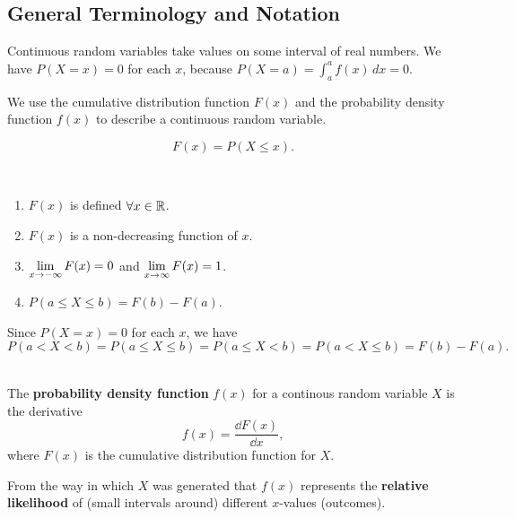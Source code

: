 \subsection{General Terminology and Notation}

Continuous random variables take values on some interval of real numbers. We have $P(X = x) = 0$ for each $x$, because $P(X = a) = \displaystyle \int_{a}^{a} f(x) \, dx = 0$. 

We use the cumulative distribution function $F(x)$ and the probability density function $f(x)$ to describe a continuous random variable.

\begin{definition}
    \phantom{}
    \[F(x) = P(X \leq x).\]
\end{definition}

\begin{theorem}
    \phantom{}\
    \begin{enumerate}
        \item $F(x)$ is defined $\forall x \in {\mathbb{R}}$.
        \item $F(x)$ is a non-decreasing function of $x$.
        \item $\displaystyle \lim_{x \to -\infty} F(x) = 0$ and $\displaystyle \lim_{x \to \infty} F(x) = 1$.
        \item  $P(a \leq X \leq b) = F(b) - F(a)$.
    \end{enumerate}
\end{theorem}

\begin{note}
    Since $P(X = x) = 0$ for each $x$, we have \vspace{-3mm}
    \[P(a < X < b) = P(a \leq X \leq b) = P(a \leq X < b) = P(a < X \leq b) = F(b) - F(a).\]
\end{note}

\begin{definition}
    \phantom{}\\
    The \textbf{probability density function} $f(x)$ for a continous random variable $X$
    is the derivative \[f(x) = \frac{\dd{F(x)}}{\dd{x}},\]
    where $F(x)$ is the cumulative distribution function for $X$.
\end{definition}

\begin{note}
    From the way in which $X$ was generated that $f(x)$ represents the \textbf{relative likelihood} of (small intervals around) different $x$-values (outcomes).
\end{note}

